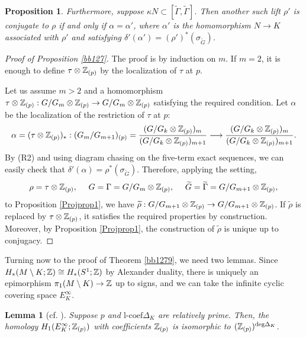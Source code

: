 \documentclass{article}
\theoremstyle{plain}
\newtheorem{prop}[thm]{Proposition}
\newtheorem{lem}[thm]{Lemma}
\theoremstyle{definition}
\newcommand{\lra}{\longrightarrow}
\newcommand{\ra}{\rightarrow}
\newcommand{\Z}{{\Bbb Z}}
\newcommand{\lc}{{\mathrm{l}\textrm{-}\mathrm{coef}}}
\begin{document}
{\begin{prop}
Furthermore, suppose $\kappa N \subset [\widetilde{\Gamma}, \widetilde{\Gamma}]$. Then another such lift $\rho'$ is conjugate to $\rho$ if and only if $\alpha = \alpha'$, where $\alpha'$ is the homomorphism $N \to K$ associated with $\rho'$ and satisfying $\delta ' (\alpha') = (\rho')^* ( \sigma_{\widetilde{G} }) $.
\end{prop}

\begin{proof}
[Proof of Proposition \ref{bb127}] The proof is by induction on $m$. If $m=2$, it is enough to define $\tau \otimes \Z_{(p)} $ by the localization of $\tau$ at $p$.

Let us assume $m>2 $ and a homomorphism $\tau\otimes \Z_{(p)} : G/G_m \otimes \Z_{(p)} \ra G/G_m \otimes \Z_{(p)} $ satisfying the required condition. Let $\alpha$ be the localization of the restriction of $ \tau $ at $p$:
\[\alpha= (\tau\otimes \Z_{(p)})_* : (G_m/G_{m+1})_{(p)} = \frac{(G/G_k \otimes \Z_{(p)})_m }{( G/G_k \otimes \Z_{(p)})_{m+1}} \lra \frac{(G/G_k \otimes \Z_{(p)})_m }{( G/G_k \otimes \Z_{(p)})_{m+1}} . \]
By (R2) and using diagram chasing on the five-term exact sequences, we can easily check that $\delta '(\alpha) = \rho^* ( \sigma_{\widetilde{G} }) $. Therefore, applying the setting,
\[ \rho= \tau\otimes \Z_{(p)}, \ \ \ \ G= \Gamma= G/G_m \otimes \Z_{(p)}, \ \ \ \ \widetilde{G}= \widetilde{\Gamma}= G/ G_{m+1}\otimes \Z_{(p)},\]
to Proposition \ref{Projprop1}, we have $\widetilde{\rho} : G/G_{m+1} \otimes \Z_{(p)} \ra G/G_{m+1} \otimes \Z_{(p)} $. If $\widetilde{\rho} $ is replaced by $\tau\otimes \Z_{(p)}$, it satisfies the required properties by construction. Moreover, by Proposition \ref{Projprop1}, the construction of $\widetilde{\rho}$ is unique up to conjugacy.
\end{proof}

Turning now to the proof of Theorem \ref{bb1279}, we need two lemmas. Since $H_*(M \setminus K;\Z ) \cong H_*(S^1;\Z) $ by Alexander duality, there is uniquely an epimorphism $ \pi_1(M \setminus K ) \ra \Z $ up to signs, and we can take the infinite cyclic covering space $E_K^{\infty} $.

\begin{lem}
[{cf. \cite[Assertion 5]{Mil}}]\label{kkk5} Suppose $p$ and $\lc \Delta_K $ are relatively prime. Then, the homology $H_1(E_K^{\infty} ;\Z_{(p)}) $ with coefficients $\Z_{(p)}$ is isomorphic to $ ( \Z_{(p)})^{\mathrm{deg} \Delta_K} $.
\end{lem}

}
\end{document}
